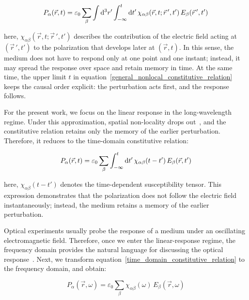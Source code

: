 \begin{equation}
    P_\alpha(\vec{r},t) =
    \varepsilon_0\sum_\beta\int\mathrm{d}^3{r'}
    \int_{-\infty}^{t}\mathrm{d}{t'}
    \,\chi_{\alpha\beta}(\vec{r},t;\vec{r}\,',t')\,E_\beta(\vec{r}\,',t')
\label{general_nonlocal_constitutive_relation}
\end{equation}

here, $\chi_{\alpha\beta}(\vec{r},t;\vec{r}\,',t')$ describes the contribution of the electric field acting at $(\vec{r}\,',t')$ to the polarization that develops later at $(\vec{r},t)$.
In this sense, the medium does not have to respond only at one point and one instant;
instead, it may spread the response over space and retain memory in time.
At the same time, the upper limit $t$ in equation~\eqref{general_nonlocal_constitutive_relation} keeps the causal order explicit: the perturbation acts first, and the response follows.

For the present work, we focus on the linear response in the long-wavelength regime.
Under this approximation, spatial non-locality drops out~\cite{raza2015nonlocal}, and the constitutive relation retains only the memory of the earlier perturbation.
Therefore, it reduces to the time-domain constitutive relation:

\begin{equation}
    P_\alpha(\vec{r},t)=
    \varepsilon_0\sum_\beta\int_{-\infty}^{t}\mathrm{d}{t'}\,\chi_{\alpha\beta}(t-t')\,E_\beta(\vec{r},t')
\label{time_domain_constitutive_relation}
\end{equation}

here, $\chi_{\alpha\beta}(t-t')$ denotes the time-dependent susceptibility tensor.
This expression demonstrates that the polarization does not follow the electric field instantaneously;
instead, the medium retains a memory of the earlier perturbation.

Optical experiments usually probe the response of a medium under an oscillating electromagnetic field.
Therefore, once we enter the linear-response regime, the frequency domain provides the natural language for discussing the optical response~\cite{han2023temperature}.
Next, we transform equation~\eqref{time_domain_constitutive_relation} to the frequency domain, and obtain:

\begin{equation}
    P_\alpha(\vec{r},\omega)=\varepsilon_0\sum_\beta\chi_{\alpha\beta}(\omega)\,E_\beta(\vec{r},\omega)
\label{frequency_domain_polarization_susceptibility_relation}
\end{equation}

